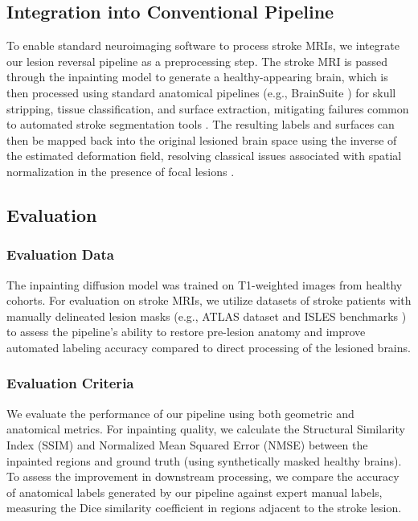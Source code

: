 \documentclass[runningheads]{llncs}
\begin{document}
\subsection{Integration into Conventional Pipeline}
To enable standard neuroimaging software to process stroke MRIs, we integrate our lesion reversal pipeline as a preprocessing step. The stroke MRI is passed through the inpainting model to generate a healthy-appearing brain, which is then processed using standard anatomical pipelines (e.g., BrainSuite \cite{Shattuck2002}) for skull stripping, tissue classification, and surface extraction, mitigating failures common to automated stroke segmentation tools \cite{Pustina2016}. The resulting labels and surfaces can then be mapped back into the original lesioned brain space using the inverse of the estimated deformation field, resolving classical issues associated with spatial normalization in the presence of focal lesions \cite{Brett2001}.

\subsection{Evaluation}
\subsubsection{Evaluation Data}
The inpainting diffusion model was trained on T1-weighted images from healthy cohorts. For evaluation on stroke MRIs, we utilize datasets of stroke patients with manually delineated lesion masks (e.g., ATLAS dataset \cite{Liew2022} and ISLES benchmarks \cite{Maier2015}) to assess the pipeline's ability to restore pre-lesion anatomy and improve automated labeling accuracy compared to direct processing of the lesioned brains.





\subsubsection{Evaluation Criteria}
We evaluate the performance of our pipeline using both geometric and anatomical metrics. For inpainting quality, we calculate the Structural Similarity Index (SSIM) and Normalized Mean Squared Error (NMSE) between the inpainted regions and ground truth (using synthetically masked healthy brains). To assess the improvement in downstream processing, we compare the accuracy of anatomical labels generated by our pipeline against expert manual labels, measuring the Dice similarity coefficient in regions adjacent to the stroke lesion.
\end{document}
